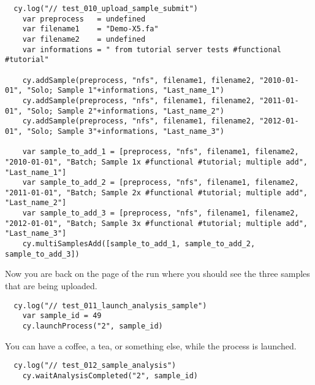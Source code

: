 \begin{verbatim}
  cy.log("// test_010_upload_sample_submit")
    var preprocess   = undefined
    var filename1    = "Demo-X5.fa"
    var filename2    = undefined
    var informations = " from tutorial server tests #functional #tutorial"

    cy.addSample(preprocess, "nfs", filename1, filename2, "2010-01-01", "Solo; Sample 1"+informations, "Last_name_1")
    cy.addSample(preprocess, "nfs", filename1, filename2, "2011-01-01", "Solo; Sample 2"+informations, "Last_name_2")
    cy.addSample(preprocess, "nfs", filename1, filename2, "2012-01-01", "Solo; Sample 3"+informations, "Last_name_3")

    var sample_to_add_1 = [preprocess, "nfs", filename1, filename2, "2010-01-01", "Batch; Sample 1x #functional #tutorial; multiple add", "Last_name_1"]
    var sample_to_add_2 = [preprocess, "nfs", filename1, filename2, "2011-01-01", "Batch; Sample 2x #functional #tutorial; multiple add", "Last_name_2"]
    var sample_to_add_3 = [preprocess, "nfs", filename1, filename2, "2012-01-01", "Batch; Sample 3x #functional #tutorial; multiple add", "Last_name_3"]
    cy.multiSamplesAdd([sample_to_add_1, sample_to_add_2, sample_to_add_3])

\end{verbatim}

Now you are back on the page of the run where you should see the three samples
that are being uploaded.

\begin{verbatim}
  cy.log("// test_011_launch_analysis_sample")
    var sample_id = 49
    cy.launchProcess("2", sample_id)

\end{verbatim}

You can have a coffee, a tea, or something else, while the process is
launched.

\begin{verbatim}
  cy.log("// test_012_sample_analysis")
    cy.waitAnalysisCompleted("2", sample_id)

\end{verbatim}

